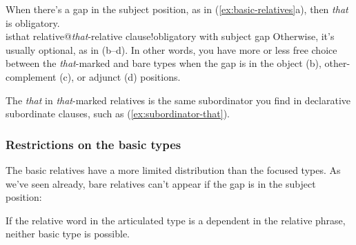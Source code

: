When there's a gap in the subject position, as in (\ref{ex:basic-relatives}a), then \textit{that} is obligatory.\\is{that relative@\textit{that}-relative clause!obligatory with subject gap} Otherwise, it's usually optional, as in (b--d). In other words, you have more or less free choice between the \textit{that}-marked and bare types when the gap is in the object (b), other-complement (c), or adjunct (d) positions.

The \textit{that} in \textit{that}-marked relatives is the same subordinator you find in declarative subordinate clauses, such as (\ref{ex:subordinator-that}).

\ea \label{ex:subordinator-that}
    \z
\z

\subsubsection*{Restrictions on the basic types}

The basic relatives have a more limited distribution than the focused types. As we've seen already, bare relatives can't appear if the gap is in the subject position:

\ea
    \z
\z

If the relative word in the articulated type is a dependent in the relative phrase, neither basic type is possible.

\ea
    \z
\z
\ea
    \z
\z

